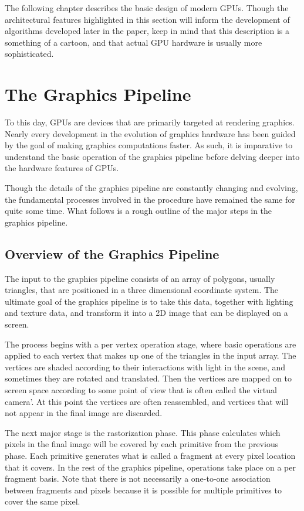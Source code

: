 \documentclass[12pt,twoside]{reedthesis}
\begin{document}
The following chapter describes the basic design of modern GPUs. Though the architectural features highlighted in this section will inform the development of algorithms developed later in the paper, keep in mind that this description is a something of a cartoon, and that actual GPU hardware is usually more sophisticated.

\section{The Graphics Pipeline}

To this day, GPUs are devices that are primarily targeted at rendering graphics. Nearly every development in the evolution of graphics hardware has been guided by the goal of making graphics computations faster. As such, it is imparative to understand the basic operation of the graphics pipeline before delving deeper into the hardware features of GPUs.

Though the details of the graphics pipeline are constantly changing and evolving, the fundamental processes involved in the procedure have remained the same for quite some time. What follows is a rough outline of the major steps in the graphics pipeline.

\subsection{Overview of the Graphics Pipeline}


The input to the graphics pipeline consists of an array of polygons, usually triangles, that are positioned in a three dimensional coordinate system. The ultimate goal of the graphics pipeline is to take this data, together with lighting and texture data, and transform it into a 2D image that can be displayed on a screen.

The process begins with a per vertex operation stage, where basic operations are applied to each vertex that makes up one of the triangles in the input array. The vertices are shaded according to their interactions with light in the scene, and sometimes they are rotated and translated. Then the vertices are mapped on to screen space according to some point of view that is often called the virtual camera'.  At this point the vertices are often reassembled, and vertices that will not appear in the final image are discarded.

The next major stage is the rastorization phase. This phase calculates which pixels in the final image will be covered by each primitive from the previous phase. Each primitive generates what is called a fragment at every pixel location that it covers. In the rest of the graphics pipeline, operations take place on a per fragment basis. Note that there is not necessarily a one-to-one association between fragments and pixels because it is possible for multiple primitives to cover the same pixel.
\end{document}
